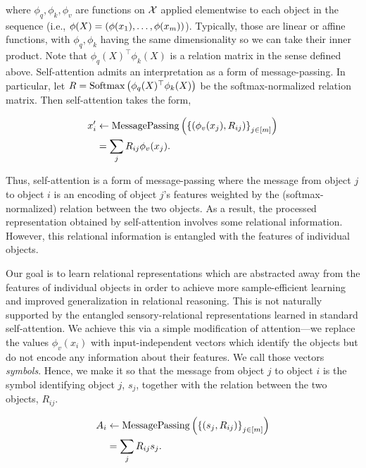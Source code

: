 \noindent where $\phi_q, \phi_k, \phi_v$ are functions on ${\mathcal{X}}$ applied elementwise to each object in the sequence (i.e., $\phi(X) = \left(\phi(x_1), \ldots, \phi(x_m)\right)$). Typically, those are linear or affine functions, with $\phi_q, \phi_k$ having the same dimensionality so we can take their inner product. Note that $\phi_q(X)^\top \phi_k(X)$ is a relation matrix in the sense defined above. Self-attention admits an interpretation as a form of message-passing. In particular, let $R = \mathrm{Softmax}\left(\phi_q(X)^\top \phi_k(X)\right)$ be the softmax-normalized relation matrix. Then self-attention takes the form,

\begin{equation}\label{eq:self_attn_message_passing}
    \begin{split}
        x_i' &\gets \mathrm{MessagePassing}\left(\left\{(\phi_v(x_j), R_{ij})\right\}_{j \in [m]}\right)\\
        &= \sum_{j} R_{ij} \phi_v(x_j).
    \end{split}
\end{equation}

Thus, self-attention is a form of message-passing where the message from object $j$ to object $i$ is an encoding of object $j$'s features weighted by the (softmax-normalized) relation between the two objects. As a result, the processed representation obtained by self-attention involves some relational information. However, this relational information is entangled with the features of individual objects.

Our goal is to learn relational representations which are abstracted away from the features of individual objects in order to achieve more sample-efficient learning and improved generalization in relational reasoning. This is not naturally supported by the entangled sensory-relational representations learned in standard self-attention. We achieve this via a simple modification of attention---we replace the values $\phi_v(x_i)$ with input-independent vectors which identify the objects but do not encode any information about their features. We call those vectors \textit{symbols}. Hence, we make it so that the message from object $j$ to object $i$ is the symbol identifying object $j$, $s_j$, together with the relation between the two objects, $R_{ij}$.

\begin{equation}\label{eq:relational_crossattn_message_passing}
    \begin{split}
        A_i &\gets \mathrm{MessagePassing}\left(\left\{(s_j, R_{ij})\right\}_{j \in [m]}\right)\\
        &= \sum_{j} R_{ij} s_j.
    \end{split}
\end{equation}

